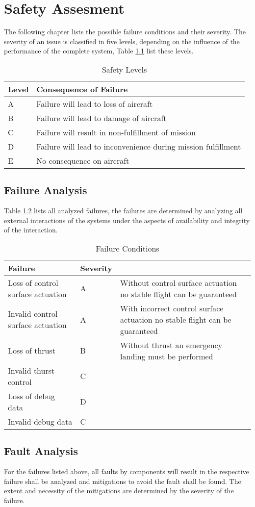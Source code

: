 \chapter{Safety Assesment}
The following chapter lists the possible failure conditions
and their severity. The severity of an issue is classified in 
five levels, depending on the influence of the performance
of the complete system, Table \ref{tab:03:severityLevels}
list these levels.

\begin{table}[H]
    \centering
    \begin{tabular}{ll}
        \toprule 
        Level & Consequence of Failure \\
        \midrule
        A & Failure will lead to loss of aircraft \\
        B & Failure will lead to damage of aircraft \\
        C & Failure will result in non-fulfillment of mission \\ 
        D & Failure will lead to inconvenience during mission fulfillment \\
        E & No consequence on aircraft \\
        \bottomrule
    \end{tabular}
    \caption{Safety Levels}
    \label{tab:03:severityLevels}
\end{table}

\section{Failure Analysis}

Table \ref{tab:03:failure} lists all analyzed failures,
the failures are determined by analyzing all external interactions
of the systems under the aspects of availability and integrity of 
the interaction.

\begin{table}[H]
    \centering
    \begin{tabular}{l|l|p{6cm}}
        \toprule
        Failure & Severity & \\
        \midrule
        Loss of control surface actuation & A & Without control surface actuation no stable flight can be guaranteed \\
        Invalid control surface actuation & A & With incorrect control surface actuation no stable flight can be guaranteed \\
        Loss of thrust & B & Without thrust an emergency landing must be performed \\
        Invalid thurst control & C & \\
        Loss of debug data & D & \\
        Invalid debug data & C & \\
        \bottomrule
    \end{tabular}
    \caption{Failure Conditions}
    \label{tab:03:failure}
\end{table}

\section{Fault Analysis}
For the failures listed above, all faults by components will result in the 
respective failure shall be analyzed and mitigations to avoid the fault 
shall be found. 
The extent and necessity of the mitigations are determined by the severity of the failure.